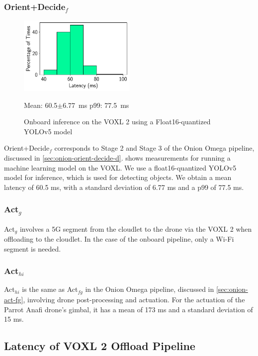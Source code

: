 \subsubsection*{Orient+Decide$_{f}$}

\begin{figure}[htbp]
\centerline{\includegraphics[width = 0.5\textwidth]{figs/onboard-inference-hist.pdf}}
\centering
Mean: 60.5$\pm$6.77~ms\; p99: 77.5~ms\\
\caption{Onboard inference on the VOXL 2 using a Float16-quantized YOLOv5 model}
\label{fig:voxl2-inference-hist}
\end{figure}

Orient+Decide$_f$ corresponds to Stage 2 and Stage 3 of the Onion Omega pipeline, discussed in \cref{sec:onion-orient-decide-d}.  shows measurements for running a machine learning model on the VOXL. We use a float16-quantized YOLOv5 model for inference, which is used for detecting objects. We obtain a mean latency of 60.5 ms, with a standard deviation of 6.77 ms and a p99 of 77.5 ms.

\subsubsection*{Act$_{g}$}

Act$_g$ involves a 5G segment from the cloudlet to the drone via the VOXL 2 when offloading to the cloudlet. In the case of the onboard pipeline, only a Wi-Fi segment is needed.

\subsubsection*{Act$_{hi}$}

Act$_{hi}$ is the same as Act$_{fg}$ in the Onion Omega pipeline, discussed in \cref{sec:onion-act-fg}, involving drone post-processing and actuation. For the actuation of the Parrot Anafi drone's gimbal, it has a mean of 173 ms and a standard deviation of 15 ms.

\subsection{Latency of VOXL 2 Offload Pipeline}

